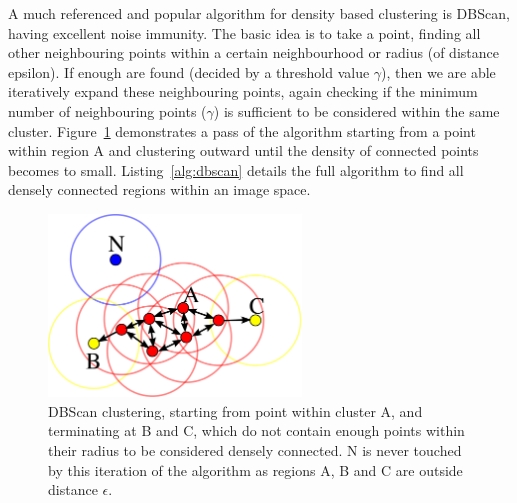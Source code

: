 \documentclass[]{article}
\begin{document}
{A much referenced and popular algorithm for density based clustering is \ac{DBScan}, having excellent noise immunity. The basic idea is to take a point, finding all other neighbouring points within a certain neighbourhood or radius (of distance epsilon). If enough are found (decided by a threshold value $\gamma$), then we are able iteratively expand these neighbouring points, again checking if the minimum number of neighbouring points ($\gamma$) is sufficient to be considered within the same cluster. Figure~\ref{fig:dbscan} demonstrates a pass of the algorithm starting from a point within region A and clustering outward until the density of connected points becomes to small. Listing~\ref{alg:dbscan} details the full algorithm to find all densely connected regions within an image space.

\begin{figure}[bt]
	\begin{center}
		\includegraphics[width=0.6\textwidth]{2000px-DBSCAN-Illustration.png}
	\end{center}
	\caption{\ac{DBScan} clustering, starting from point within cluster A, and terminating at B and C, which do not contain enough points within their radius to be considered densely connected. N is never touched by this iteration of the algorithm as regions A, B and C are outside distance $\epsilon$.}
	\label{fig:dbscan}
	
\end{figure}

}
\end{document}
